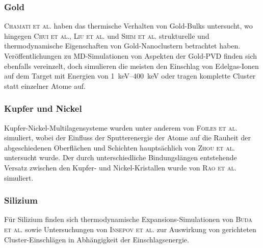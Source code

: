 \subsubsection{Gold}
\textsc{Chamati et al.}\cite{chamati_second-moment_2004} haben das thermische Verhalten von Gold-Bulks untersucht, wo hingegen \textsc{Chui et al.}\cite{chui_molecular_2007}, \textsc{Liu et al.}\cite{liu_melting_2001} und \textsc{Shim et al.}\cite{shim_molecular_2003} strukturelle und thermodynamische Eigenschaften von Gold-Nanoclustern betrachtet haben.
Veröffentlichungen zu MD-Simulationen von Aspekten der Gold-PVD finden sich ebenfalls vereinzelt, doch simulieren die meisten den Einschlag von Edelgas-Ionen auf dem Target mit Energien von \SIrange{1}{400}{\kilo\electronvolt}\cite{insepov_molecular_1995,shapiro_simulation_1999} oder tragen komplette Cluster statt einzelner Atome auf\cite{inoue_molecular_2008}.

\subsubsection{Kupfer und Nickel}
Kupfer-Nickel-Multilagensysteme wurden unter anderem von \textsc{Foiles et al.}\cite{foiles_calculation_1985} simuliert, wobei der Einfluss der Sputterenergie der Atome auf die Rauheit der abgeschiedenen Oberflächen und Schichten hauptsächlich von \textsc{Zhou et al.}\cite{zhou_atomistic_1998} untersucht wurde.
Der durch unterschiedliche Bindungslängen entstehende Versatz zwischen den Kupfer- und Nickel-Kristallen wurde von \textsc{Rao et al.}\cite{rao_atomistic_2000} simuliert.

\subsubsection{Silizium}
Für Silizium finden sich thermodynamische Expansions-Simulationen von \textsc{Buda et al.}\cite{buda_thermal_1990} sowie Untersuchungen von \textsc{Insepov et al.}\cite{insepov_molecular_1995} zur Auswirkung von gerichteten Cluster-Einschlägen in Abhängigkeit der Einschlagsenergie.

